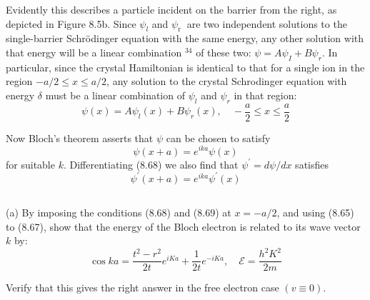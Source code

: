 \documentclass[12pt]{article}
\begin{document}
Evidently this describes a particle incident on the barrier from the right, as depicted in Figure 8.5b.
Since $\psi_l$ and $\psi_{\text {r }}$ are two independent solutions to the single-barrier Schrödinger equation with the same energy, any other solution with that energy will be a linear combination ${ }^{34}$ of these two: $\psi=A \psi_I+B \psi_r$. In particular, since the crystal Hamiltonian is identical to that for a single ion in the region $-a / 2 \leqslant x \leqslant a / 2$, any solution to the crystal Schrodinger equation with energy $\delta$ must be a linear combination of $\psi_l$ and $\psi_r$ in that region:
$$
\psi(x)=A \psi_l(x)+B \psi_r(x), \quad-\frac{a}{2} \leqslant x \leqslant \frac{a}{2}
$$

Now Bloch's theorem asserts that $\psi$ can be chosen to satisfy
$$
\psi(x+a)=e^{i k a} \psi(x)
$$
for suitable $k$. Differentiating (8.68) we also find that $\psi^{\prime}=d \psi / d x$ satisfies
$$
\psi^{\prime}(x+a)=e^{i k a} \psi^{\prime}(x)
$$
\subsection{}
(a) By imposing the conditions (8.68) and (8.69) at $x=-a / 2$, and using (8.65) to (8.67), show that the energy of the Bloch electron is related to its wave vector $k$ by:
$$
\cos k a=\frac{t^2-r^2}{2 t} e^{i K a}+\frac{1}{2 t} e^{-i K a}, \quad \mathcal{E}=\frac{h^2 K^2}{2 m}
$$

Verify that this gives the right answer in the free electron case $(v \equiv 0)$.
\end{document}
